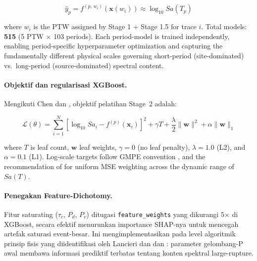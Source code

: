 \documentclass[10pt]{article}
\renewcommand{\cite}[1]{\citep{#1}}
\begin{document}
\[\hat{y}_{p} = f^{(p,\,w_i)}\!\left(\mathbf{x}(w_i)\right) \approx \log_{10} Sa(T_p)\]

where \(w_i\) is the PTW assigned by Stage 1 + Stage 1.5 for trace \(i\). Total models: \textbf{515} (5 PTW × 103 periods). Each period-model is trained independently, enabling period-specific hyperparameter optimization and capturing the fundamentally different physical scales governing short-period (site-dominated) vs.~long-period (source-dominated) spectral content.

\paragraph{Objektif dan regularisasi XGBoost.} Mengikuti Chen dan \citet{ref36}, objektif pelatihan Stage~2 adalah:

\[\mathcal{L}(\theta) = \sum_{i=1}^{N} \left[\log_{10}Sa_i - f^{(p)}(\mathbf{x}_i)\right]^2 + \gamma T + \frac{\lambda}{2}\|\mathbf{w}\|^2 + \alpha\|\mathbf{w}\|_1\]

where \(T\) is leaf count, \(\mathbf{w}\) leaf weights, \(\gamma = 0\) (no leaf penalty), \(\lambda = 1.0\) (L2), and \(\alpha = 0.1\) (L1). Log-scale targets follow GMPE convention \cite{ref48}, \cite{ref62} and the recommendation of \citet{ref35} for uniform MSE weighting across the dynamic range of \(Sa(T)\).

\paragraph{Penegakan Feature-Dichotomy.} Fitur saturating (\(\tau_c\), \(P_d\), \(P_v\)) ditugasi \texttt{feature\_weights} yang dikurangi 5$\times$ di XGBoost, secara efektif menurunkan importance SHAP-nya untuk mencegah artefak saturasi event-besar. Ini mengimplementasikan pada level algoritmik prinsip fisis yang diidentifikasi oleh Lancieri dan \citet{ref24} dan \citet{ref26}: parameter gelombang-P awal membawa informasi prediktif terbatas tentang konten spektral large-rupture.
\end{document}
